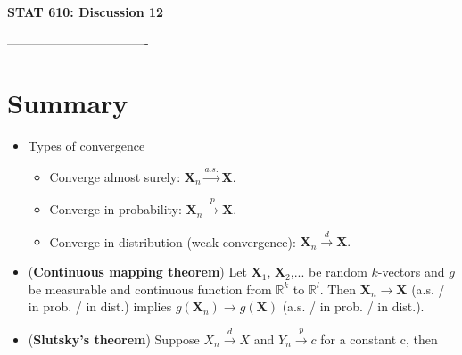 \documentclass[12pt]{extarticle}
\begin{document}
	
	\begin{center}
		{\large \bf STAT 610: Discussion 12}
	\end{center}
	\vspace{0.22cm}
----------------------------------%


  \section{Summary}
  \begin{itemize}
  	\item Types of convergence
  	\begin{itemize}
  		\item Converge almost surely: $\mathbf X_n \xrightarrow{a.s.} \mathbf X.$
  		\item Converge in probability: $\mathbf X_n \xrightarrow{p} \mathbf X.$
  		\item Converge in distribution (weak convergence): $\mathbf X_n \xrightarrow{d} \mathbf X.$
  	\end{itemize}
  	\item (\textbf{Continuous mapping theorem}) Let $\mathbf X_1$, $\mathbf X_2$,... be random $k$-vectors and $g$ be measurable and continuous function from $\mathbb R^k$ to $\mathbb R^l$. Then $\mathbf X_n \rightarrow \mathbf X$ (a.s. / in prob. / in dist.) implies $g(\mathbf X_n) \rightarrow g(\mathbf X)$ (a.s. / in prob. / in dist.). 
  	\item (\textbf{Slutsky's theorem}) Suppose $X_n \xrightarrow{d} X$ and $Y_n \xrightarrow{p} c$ for a constant c, then 
  	

\end{itemize}
\end{document}
